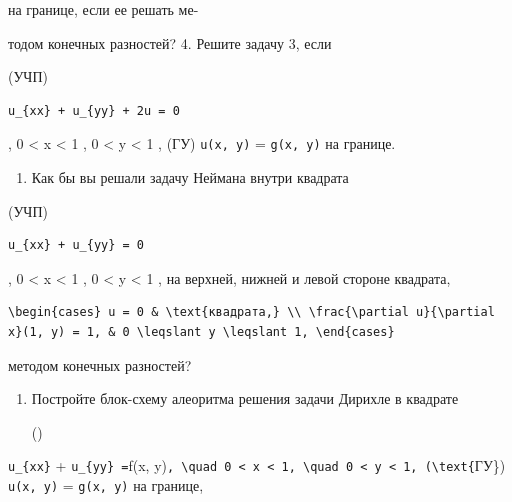 \documentclass[
  ukrainian,
]{article}
\providecommand{\tightlist}{%
  \setlength{\itemsep}{0pt}\setlength{\parskip}{0pt}}
\begin{document}
на границе, если ее решать ме-

тодом конечных разностей? 4. Решите задачу 3, если

(УЧП)

\begin{verbatim}
u_{xx} + u_{yy} + 2u = 0
\end{verbatim}

, 0 \textless{} x \textless{} 1 , 0 \textless{} y \textless{} 1 , (ГУ)
\texttt{u(x,\ y)} = \texttt{g(x,\ y)} на границе.

\begin{enumerate}
\def\labelenumi{\arabic{enumi}.}
\setcounter{enumi}{4}
\tightlist
\item
  Как бы вы решали задачу Неймана внутри квадрата
\end{enumerate}

(УЧП)

\begin{verbatim}
u_{xx} + u_{yy} = 0
\end{verbatim}

, 0 \textless{} x \textless{} 1 , 0 \textless{} y \textless{} 1 , на
верхней, нижней и левой стороне квадрата,

\begin{verbatim}
\begin{cases} u = 0 & \text{квадрата,} \\ \frac{\partial u}{\partial x}(1, y) = 1, & 0 \leqslant y \leqslant 1, \end{cases}
\end{verbatim}

методом конечных разностей?

\begin{enumerate}
\def\labelenumi{\arabic{enumi}.}
\setcounter{enumi}{5}
\item
  Постройте блок-схему алеоритма решения задачи Дирихле в квадрате

  ()
\end{enumerate}

\texttt{u\_\{xx\}} + \texttt{u\_\{yy\}\ =}f(x,
y)\texttt{,\ \textbackslash{}quad\ 0\ \textless{}\ x\ \textless{}\ 1,\ \textbackslash{}quad\ 0\ \textless{}\ y\ \textless{}\ 1,\ (\textbackslash{}text\{}ГУ\})
\texttt{u(x,\ y)} = \texttt{g(x,\ y)} на границе,
\end{document}
